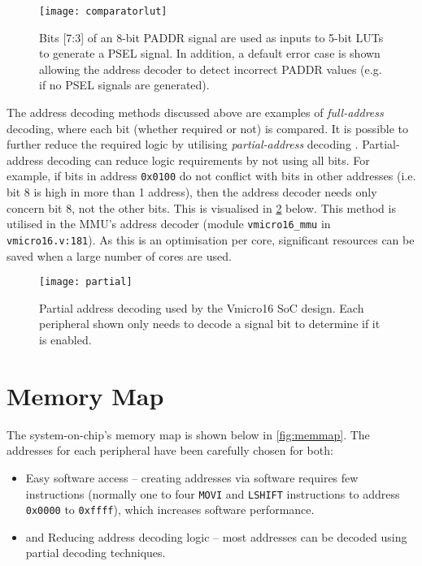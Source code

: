 \begin{figure}[H]
\centering
\texttt{[image: comparatorlut]}
\caption{Bits [7:3] of an 8-bit PADDR signal are used as inputs to 5-bit LUTs to generate a PSEL signal. In addition, a default error case is shown allowing the address decoder to detect incorrect PADDR values (e.g. if no PSEL signals are generated).}
\label{fig:comparatorlut}
\end{figure}

The address decoding methods discussed above are examples of \textit{full-address} decoding, where each bit (whether required or not) is compared. It is possible to further reduce the required logic by utilising \textit{partial-address} decoding \cite{tanenbaum2016structured}. Partial-address decoding can reduce logic requirements by not using all bits. For example, if bits in address \verb|0x0100| do not conflict with bits in other addresses (i.e. bit 8 is high in more than 1 address), then the address decoder needs only concern bit 8, not the other bits. This is visualised in \cref{fig:partial} below. This method is utilised in the MMU's address decoder (module \verb|vmicro16_mmu| in \verb|vmicro16.v:181|). As this is an optimisation per core, significant resources can be saved when a large number of cores are used.

\begin{figure}[H]
\centering
\texttt{[image: partial]}
\caption{Partial address decoding used by the Vmicro16 SoC design. Each peripheral shown only needs to decode a signal bit to determine if it is enabled.}
\label{fig:partial}
\end{figure}

\newpage
\section{Memory Map}
The system-on-chip's memory map is shown below in \cref{fig:memmap}. The addresses for each peripheral have been carefully chosen for both:
\begin{itemize}
\item Easy software access -- creating addresses via software requires few instructions (normally one to four \verb|MOVI| and \verb|LSHIFT| instructions to address \verb|0x0000| to  \verb|0xffff|), which increases software performance.
\item and Reducing address decoding logic -- most addresses can be decoded using partial decoding techniques.
\end{itemize}

